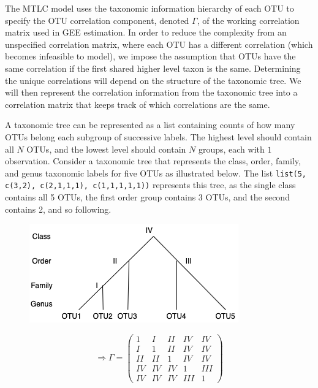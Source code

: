 \documentclass[12pt]{article}
\begin{document}
The MTLC model uses the taxonomic information hierarchy of each OTU to specify the OTU correlation component, denoted $\Gamma$, of the working correlation matrix used in GEE estimation. In order to reduce the complexity from an unspecified correlation matrix, where each OTU has a different correlation (which becomes infeasible to model), we impose the assumption that OTUs have the same correlation if the first shared higher level taxon is the same. Determining the unique correlations will depend on the structure of the taxonomic tree. We will then represent the correlation information from the taxonomic tree into a correlation matrix that keeps track of which correlations are the same.


A taxonomic tree can be represented as a list containing counts of how many OTUs belong each subgroup of successive labels. The highest level should contain all $N$ OTUs, and the lowest level should contain $N$ groups, each with $1$ observation. Consider a taxonomic tree that represents the class, order, family, and genus taxonomic labels for five OTUs as illustrated below. The list \texttt{list(5, c(3,2), c(2,1,1,1), c(1,1,1,1,1))} represents this tree, as the single class contains all 5 OTUs, the first order group contains 3 OTUs, and the second contains 2, and so following.

\begin{figure}
\begin{minipage}{.5\textwidth}
    \centering
    \includegraphics[width = .8\textwidth]{tree.png}
\end{minipage}%
\begin{minipage}{0.5\textwidth}
    \centering
    $$ \Rightarrow  \Gamma =\begin{pmatrix}
            1 & I & II & IV & IV \\
            I & 1 & II & IV & IV \\
            II & II & 1 & IV & IV \\
            IV & IV & IV & 1 & III \\
            IV & IV & IV & III & 1
      \end{pmatrix} $$
\end{minipage}
\end{figure}
\end{document}
